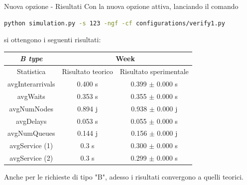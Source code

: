 \documentclass[xcolor=table]{beamer}
\begin{document}
\begin{frame}[fragile]{Nuova opzione - Risultati}\justifying
Con la nuova opzione attiva, lanciando il comando
\begin{lstlisting}[language=Bash, numbers=none, ]
python simulation.py -s 123 -ngf -cf configurations/verify1.py
\end{lstlisting}

si ottengono i seguenti risultati:
\bigskip

\centering
\begin{adjustbox}{scale=0.6}

\begin{tabular}{ |c|c|c| }
\hline
\cellcolor{cellcolor} \textit{B type} & \multicolumn{2}{c|}{\cellcolor{cellcolor}Week} \\
\hline
\cellcolor{cellcolor}Statistica & \cellcolor{cellcolor}Risultato teorico & \cellcolor{cellcolor}Risultato sperimentale \\
\hline
\hline
avgInterarrivals & 0.400 s & 0.399 $\pm$ 0.000 s \\
\hline
avgWaits & 0.353 s & 0.355 $\pm$ 0.000 s \\
\hline
avgNumNodes & 0.894 j & 0.938 $\pm$ 0.000 j \\
\hline
avgDelays & 0.053 s & 0.055 $\pm$ 0.000 s \\
\hline
avgNumQueues & 0.144 j & 0.156 $\pm$ 0.000 j \\
\hline
avgService (1) & 0.3 s & 0.300 $\pm$ 0.000 s \\
\hline
avgService (2) & 0.3 s & 0.299 $\pm$ 0.000 s \\
\hline
\end{tabular}
\end{adjustbox}
\bigskip

Anche per le richieste di tipo "B", adesso i risultati convergono a quelli teorici.
\end{frame}
\end{document}
